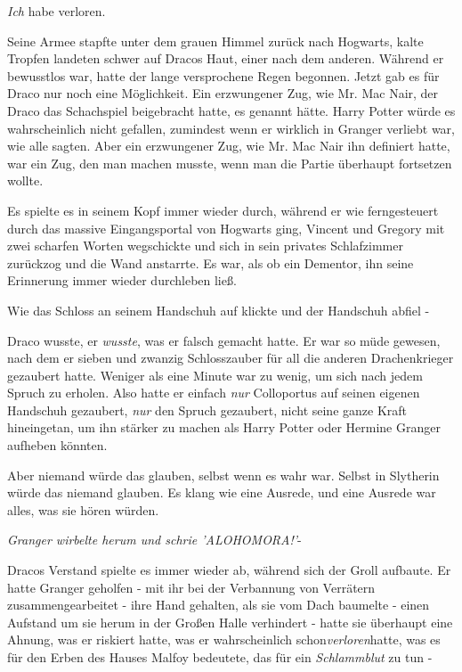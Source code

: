 {\emph{Ich} habe verloren.

Seine Armee stapfte unter dem grauen Himmel zurück nach Hogwarts, kalte Tropfen landeten schwer auf Dracos Haut, einer nach dem anderen. Während er bewusstlos war, hatte der lange versprochene Regen begonnen. Jetzt gab es für Draco nur noch eine Möglichkeit. Ein erzwungener Zug, wie Mr. Mac Nair, der Draco das Schachspiel beigebracht hatte, es genannt hätte. Harry Potter würde es wahrscheinlich nicht gefallen, zumindest wenn er wirklich in Granger verliebt war, wie alle sagten. Aber ein erzwungener Zug, wie Mr. Mac Nair ihn definiert hatte, war ein Zug, den man machen musste, wenn man die Partie überhaupt fortsetzen wollte.

Es spielte es in seinem Kopf immer wieder durch, während er wie ferngesteuert durch das massive Eingangsportal von Hogwarts ging, Vincent und Gregory mit zwei scharfen Worten wegschickte und sich in sein privates Schlafzimmer zurückzog und die Wand anstarrte. Es war, als ob ein Dementor, ihn seine Erinnerung immer wieder durchleben ließ.

Wie das Schloss an seinem Handschuh auf klickte und der Handschuh abfiel -

Draco wusste, er \emph{wusste}, was er falsch gemacht hatte. Er war so müde gewesen, nach dem er sieben und zwanzig Schlosszauber für all die anderen Drachenkrieger gezaubert hatte. Weniger als eine Minute war zu wenig, um sich nach jedem Spruch zu erholen. Also hatte er einfach \emph{nur} Colloportus auf seinen eigenen Handschuh gezaubert, \emph{nur} den Spruch gezaubert, nicht seine ganze Kraft hineingetan, um ihn stärker zu machen als Harry Potter oder Hermine Granger aufheben könnten.

Aber niemand würde das glauben, selbst wenn es wahr war. Selbst in Slytherin würde das niemand glauben. Es klang wie eine Ausrede, und eine Ausrede war alles, was sie hören würden.

\emph{Granger wirbelte herum und schrie 'ALOHOMORA!'}-

Dracos Verstand spielte es immer wieder ab, während sich der Groll aufbaute. Er hatte Granger geholfen - mit ihr bei der Verbannung von Verrätern zusammengearbeitet - ihre Hand gehalten, als sie vom Dach baumelte - einen Aufstand um sie herum in der Großen Halle verhindert - hatte sie überhaupt eine Ahnung, was er riskiert hatte, was er wahrscheinlich schon\emph{verloren}hatte, was es für den Erben des Hauses Malfoy bedeutete, das für ein \emph{Schlammblut} zu tun -

}
